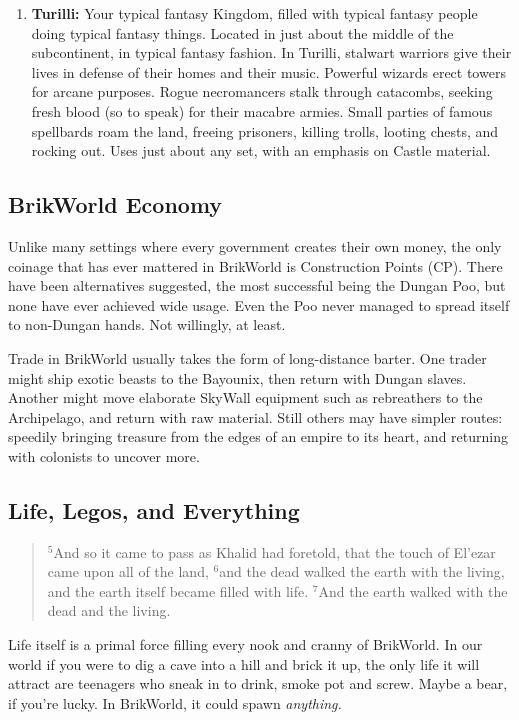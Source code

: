 \documentclass[12pt,a4paper,twocolumn]{article}
\begin{document}
\begin{enumerate}
\item {\bf Turilli:} Your typical fantasy Kingdom, filled with typical fantasy people doing typical fantasy things.  Located in just about the middle of the subcontinent, in typical fantasy fashion.  In Turilli, stalwart warriors give their lives in defense of their homes and their music.  Powerful wizards erect towers for arcane purposes.  Rogue necromancers stalk through catacombs, seeking fresh blood (so to speak) for their macabre armies.  Small parties of famous spellbards roam the land, freeing prisoners, killing trolls, looting chests, and rocking out.  Uses just about any set, with an emphasis on Castle material.

\end{enumerate}

\subsection{BrikWorld Economy}

Unlike many settings where every government creates their own money, the only coinage that has ever mattered in BrikWorld is Construction Points (CP).  There have been alternatives suggested, the most successful being the Dungan Poo, but none have ever achieved wide usage.  Even the Poo never managed to spread itself to non-Dungan hands.  Not willingly, at least.

Trade in BrikWorld usually takes the form of long-distance barter.  One trader might ship exotic beasts to the Bayounix, then return with Dungan slaves.  Another might move elaborate SkyWall equipment such as rebreathers to the Archipelago, and return with raw material.  Still others may have simpler routes: speedily bringing treasure from the edges of an empire to its heart, and returning with colonists to uncover more.

\subsection{Life, Legos, and Everything}
\begin{quote}
$^{5}$And so it came to pass as Khalid had foretold, that the touch of El'ezar came upon all of the land, $^{6}$and the dead walked the earth with the living, and the earth itself became filled with life.  $^{7}$And the earth walked with the dead and the living.
\end{quote}

Life itself is a primal force filling every nook and cranny of BrikWorld.  In our world if you were to dig a cave into a hill and brick it up, the only life it will attract are teenagers who sneak in to drink, smoke pot and screw.  Maybe a bear, if you're lucky.  In BrikWorld, it could spawn {\em anything.}  
\end{document}
